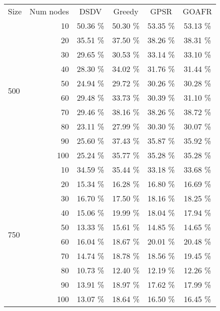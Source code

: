 \begin{tabular}{lrcccc}
Size & Num nodes & DSDV & Greedy & GPSR & GOAFR \\
 \multirow{10}{*}{500} & 10 & 50.36 \% & 50.30 \% & 53.35 \% & 53.13 \% \\
  & 20 & 35.51 \% & 37.50 \% & 38.26 \% & 38.31 \% \\
  & 30 & 29.65 \% & 30.53 \% & 33.14 \% & 33.10 \% \\
  & 40 & 28.30 \% & 34.02 \% & 31.76 \% & 31.44 \% \\
  & 50 & 24.94 \% & 29.72 \% & 30.26 \% & 30.28 \% \\
  & 60 & 29.48 \% & 33.73 \% & 30.39 \% & 31.10 \% \\
  & 70 & 29.46 \% & 38.16 \% & 38.26 \% & 38.72 \% \\
  & 80 & 23.11 \% & 27.99 \% & 30.30 \% & 30.07 \% \\
  & 90 & 25.60 \% & 37.43 \% & 35.87 \% & 35.92 \% \\
  & 100 & 25.24 \% & 35.77 \% & 35.28 \% & 35.28 \% \\
\hline
 \multirow{10}{*}{750} & 10 & 34.59 \% & 35.44 \% & 33.18 \% & 33.68 \% \\
  & 20 & 15.34 \% & 16.28 \% & 16.80 \% & 16.69 \% \\
  & 30 & 16.70 \% & 17.50 \% & 18.16 \% & 18.25 \% \\
  & 40 & 15.06 \% & 19.99 \% & 18.04 \% & 17.94 \% \\
  & 50 & 13.33 \% & 15.61 \% & 14.85 \% & 14.65 \% \\
  & 60 & 16.04 \% & 18.67 \% & 20.01 \% & 20.48 \% \\
  & 70 & 14.74 \% & 18.78 \% & 18.56 \% & 19.45 \% \\
  & 80 & 10.73 \% & 12.40 \% & 12.19 \% & 12.26 \% \\
  & 90 & 13.91 \% & 18.97 \% & 17.62 \% & 17.99 \% \\
  & 100 & 13.07 \% & 18.64 \% & 16.50 \% & 16.45 \% \\
\end{tabular}
